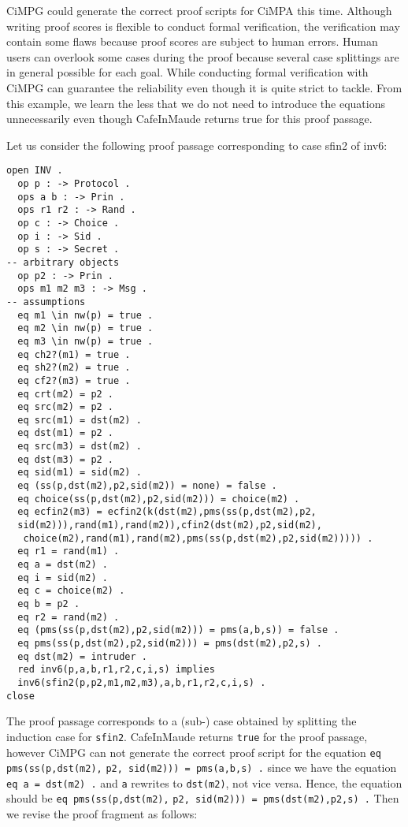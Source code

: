 \documentclass[a4paper,fleqn]{cas-dc}
\begin{document}
CiMPG could generate the correct proof scripts for CiMPA this time. Although writing proof scores is flexible to conduct formal verification, the verification may contain some flaws because proof scores are subject to human errors. Human users can overlook some cases during the proof because several case splittings are in general possible for each goal. While conducting formal verification with CiMPG can guarantee the reliability even though it is quite strict to tackle. From this example, we learn the less that we do not need to introduce the equations unnecessarily even though CafeInMaude returns true for this proof passage. 

Let us consider the following proof passage corresponding to case sfin2 of inv6:
\begin{small}
\begin{verbatim}
open INV .
  op p : -> Protocol .
  ops a b : -> Prin .
  ops r1 r2 : -> Rand .
  op c : -> Choice .
  op i : -> Sid .
  op s : -> Secret .
-- arbitrary objects
  op p2 : -> Prin .
  ops m1 m2 m3 : -> Msg .
-- assumptions
  eq m1 \in nw(p) = true .
  eq m2 \in nw(p) = true .
  eq m3 \in nw(p) = true .
  eq ch2?(m1) = true .
  eq sh2?(m2) = true .
  eq cf2?(m3) = true .
  eq crt(m2) = p2 .
  eq src(m2) = p2 .
  eq src(m1) = dst(m2) .
  eq dst(m1) = p2 .
  eq src(m3) = dst(m2) .
  eq dst(m3) = p2 .
  eq sid(m1) = sid(m2) .
  eq (ss(p,dst(m2),p2,sid(m2)) = none) = false .
  eq choice(ss(p,dst(m2),p2,sid(m2))) = choice(m2) .
  eq ecfin2(m3) = ecfin2(k(dst(m2),pms(ss(p,dst(m2),p2,
  sid(m2))),rand(m1),rand(m2)),cfin2(dst(m2),p2,sid(m2),
   choice(m2),rand(m1),rand(m2),pms(ss(p,dst(m2),p2,sid(m2))))) .
  eq r1 = rand(m1) .
  eq a = dst(m2) .
  eq i = sid(m2) .
  eq c = choice(m2) .
  eq b = p2 .
  eq r2 = rand(m2) .
  eq (pms(ss(p,dst(m2),p2,sid(m2))) = pms(a,b,s)) = false .
  eq pms(ss(p,dst(m2),p2,sid(m2))) = pms(dst(m2),p2,s) .
  eq dst(m2) = intruder .
  red inv6(p,a,b,r1,r2,c,i,s) implies
  inv6(sfin2(p,p2,m1,m2,m3),a,b,r1,r2,c,i,s) .
close
\end{verbatim}
\end{small}
The proof passage corresponds to a (sub-) case obtained by splitting the induction case for \verb!sfin2!. CafeInMaude returns \verb!true! for the proof passage, however CiMPG can not generate the correct proof script for the equation 
\verb!eq pms(ss(p,dst(m2),! \verb!p2, sid(m2))) = pms(a,b,s) .!
since we have the equation \verb!eq a = dst(m2) .! and \verb!a! rewrites to \verb!dst(m2)!, not vice versa. Hence, the equation should be \verb!eq pms(ss(p,dst(m2),! \verb!p2, sid(m2))) = pms(dst(m2),p2,s) .! Then we revise the proof fragment as follows:
\end{document}
